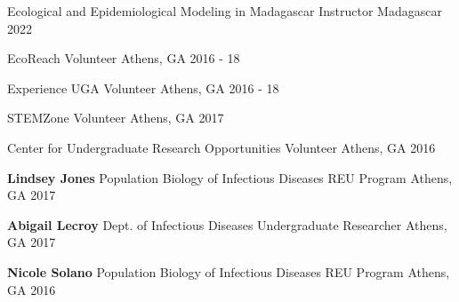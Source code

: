 


\begin{cvhonors}


    \cvhonor
      {Ecological and Epidemiological Modeling in Madagascar}
      {Instructor}
      {Madagascar}
      {2022}

    \cvhonor
      {EcoReach}
      {Volunteer}
      {Athens, GA}
      {2016 - 18}

    \cvhonor
      {Experience UGA}
      {Volunteer}
      {Athens, GA}
      {2016 - 18}

    \cvhonor
      {STEMZone}
      {Volunteer}
      {Athens, GA}
      {2017}

    \cvhonor
      {Center for Undergraduate Research Opportunities} %
      {Volunteer} %
      {Athens, GA} %
      {2016} %
\end{cvhonors}

\begin{cvhonors}

  \cvhonor
    {\textbf{Lindsey Jones}} %
    {Population Biology of Infectious Diseases REU Program} %
    {Athens, GA} %
    {2017} %

  \cvhonor
    {\textbf{Abigail Lecroy}} %
    {Dept. of Infectious Diseases Undergraduate Researcher} %
    {Athens, GA} %
    {2017} %

  \cvhonor
    {\textbf{Nicole Solano}} %
    {Population Biology of Infectious Diseases REU Program} %
    {Athens, GA} %
    {2016} %

\end{cvhonors}

